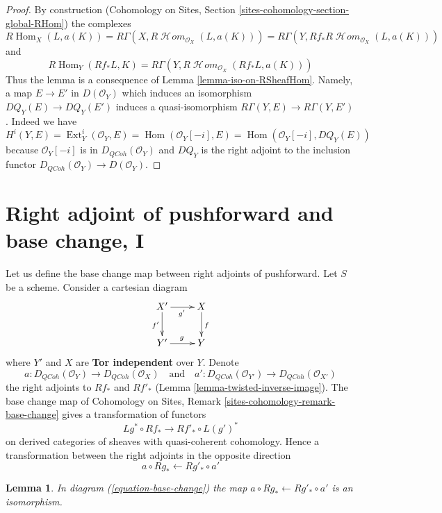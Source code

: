 \documentclass{stacks-project}
\theoremstyle{plain}
\newtheorem{lemma}[subsection]{Lemma}
\theoremstyle{definition}
\theoremstyle{remark}
\numberwithin{equation}{subsection}
\def\Hom{\mathop{\mathrm{Hom}}\nolimits}
\def\Ext{\mathop{\mathrm{Ext}}\nolimits}
\def\SheafHom{\mathop{\mathcal{H}\!\mathit{om}}\nolimits}
\def\QCoh{\mathit{QCoh}}
\begin{document}
\begin{proof}
By construction (Cohomology on Sites, Section
\ref{sites-cohomology-section-global-RHom}) the complexes
$$
R\Hom_X(L, a(K)) =
R\Gamma(X, R\SheafHom_{\mathcal{O}_X}(L, a(K))) =
R\Gamma(Y, Rf_*R\SheafHom_{\mathcal{O}_X}(L, a(K)))
$$
and
$$
R\Hom_Y(Rf_*L, K) = R\Gamma(Y, R\SheafHom_{\mathcal{O}_X}(Rf_*L, a(K)))
$$
Thus the lemma is a consequence of Lemma \ref{lemma-iso-on-RSheafHom}.
Namely, a map $E \to E'$ in $D(\mathcal{O}_Y)$ which induces
an isomorphism $DQ_Y(E) \to DQ_Y(E')$ induces a quasi-isomorphism
$R\Gamma(Y, E) \to R\Gamma(Y, E')$. Indeed we have
$H^i(Y, E) = \Ext^i_Y(\mathcal{O}_Y, E) = \Hom(\mathcal{O}_Y[-i], E) =
\Hom(\mathcal{O}_Y[-i], DQ_Y(E))$ because $\mathcal{O}_Y[-i]$
is in $D_\QCoh(\mathcal{O}_Y)$ and $DQ_Y$ is the right adjoint
to the inclusion functor $D_\QCoh(\mathcal{O}_Y) \to D(\mathcal{O}_Y)$.
\end{proof}









\section{Right adjoint of pushforward and base change, I}
\label{section-base-change-map}

\noindent
Let us define the base change map between right adjoints of pushforward.
Let $S$ be a scheme. Consider a cartesian diagram
\begin{equation}
\label{equation-base-change}
\vcenter{
\xymatrix{
X' \ar[r]_{g'} \ar[d]_{f'} & X \ar[d]^f \\
Y' \ar[r]^g & Y
}
}
\end{equation}
where $Y'$ and $X$ are {\bf Tor independent} over $Y$. Denote
$$
a  : D_\QCoh(\mathcal{O}_Y) \to D_\QCoh(\mathcal{O}_X)
\quad\text{and}\quad
a' : D_\QCoh(\mathcal{O}_{Y'}) \to D_\QCoh(\mathcal{O}_{X'})
$$
the right adjoints to $Rf_*$ and $Rf'_*$
(Lemma \ref{lemma-twisted-inverse-image}).
The base change map of
Cohomology on Sites, Remark \ref{sites-cohomology-remark-base-change}
gives a transformation of functors
$$
Lg^* \circ Rf_* \longrightarrow Rf'_* \circ L(g')^*
$$
on derived categories of sheaves with quasi-coherent cohomology.
Hence a transformation between the right adjoints in the opposite direction
$$
a \circ Rg_* \longleftarrow Rg'_* \circ a'
$$

\begin{lemma}
\label{lemma-flat-precompose-pus}
In diagram (\ref{equation-base-change}) the map
$a \circ Rg_* \leftarrow Rg'_* \circ a'$ is an isomorphism.
\end{lemma}
\end{document}
